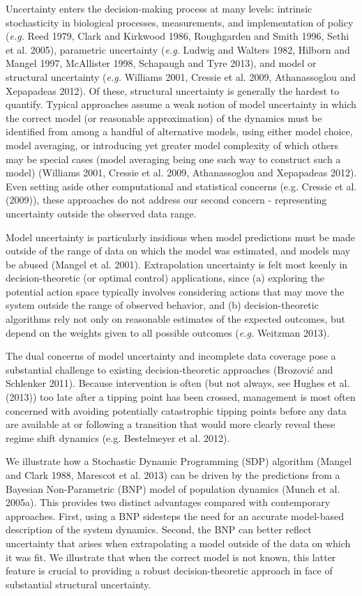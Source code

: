 \documentclass[author-year, 12pt,review]{components/elsarticle} %
\begin{document}
Uncertainty enters the decision-making process at many levels: intrinsic
stochasticity in biological processes, measurements, and implementation
of policy (\emph{e.g.} Reed 1979, Clark and Kirkwood 1986, Roughgarden
and Smith 1996, Sethi et al. 2005), parametric uncertainty (\emph{e.g.}
Ludwig and Walters 1982, Hilborn and Mangel 1997, McAllister 1998,
Schapaugh and Tyre 2013), and model or structural uncertainty
(\emph{e.g.} Williams 2001, Cressie et al. 2009, Athanassoglou and
Xepapadeas 2012). Of these, structural uncertainty is generally the
hardest to quantify. Typical approaches assume a weak notion of model
uncertainty in which the correct model (or reasonable approximation) of
the dynamics must be identified from among a handful of alternative
models, using either model choice, model averaging, or introducing yet
greater model complexity of which others may be special cases (model
averaging being one such way to construct such a model) (Williams 2001,
Cressie et al. 2009, Athanassoglou and Xepapadeas 2012). Even setting
aside other computational and statistical concerns (e.g. Cressie et al.
(2009)), these approaches do not address our second concern -
representing uncertainty outside the observed data range.

Model uncertainty is particularly insidious when model predictions must
be made outside of the range of data on which the model was estimated,
and models may be abused (Mangel et al. 2001). Extrapolation uncertainty
is felt most keenly in decision-theoretic (or optimal control)
applications, since (a) exploring the potential action space typically
involves considering actions that may move the system outside the range
of observed behavior, and (b) decision-theoretic algorithms rely not
only on reasonable estimates of the expected outcomes, but depend on the
weights given to all possible outcomes (\emph{e.g.} Weitzman 2013).

The dual concerns of model uncertainty and incomplete data coverage pose
a substantial challenge to existing decision-theoretic approaches
(Brozović and Schlenker 2011). Because intervention is often (but not
always, see Hughes et al. (2013)) too late after a tipping point has
been crossed, management is most often concerned with avoiding
potentially catastrophic tipping points before any data are available at
or following a transition that would more clearly reveal these regime
shift dynamics (e.g. Bestelmeyer et al. 2012).

We illustrate how a Stochastic Dynamic Programming (SDP) algorithm
(Mangel and Clark 1988, Marescot et al. 2013) can be driven by the
predictions from a Bayesian Non-Parametric (BNP) model of population
dynamics (Munch et al. 2005a). This provides two distinct advantages
compared with contemporary approaches. First, using a BNP sidesteps the
need for an accurate model-based description of the system dynamics.
Second, the BNP can better reflect uncertainty that arises when
extrapolating a model outside of the data on which it was fit. We
illustrate that when the correct model is not known, this latter feature
is crucial to providing a robust decision-theoretic approach in face of
substantial structural uncertainty.
\end{document}
